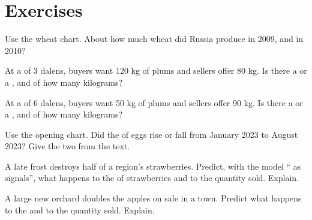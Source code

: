 \section{Exercises}

\begin{exercise}[$\star$]\label{exo:g7:markets-and-prices:1}
Use the wheat chart. About how much wheat did Russia produce in 2009, and in 2010?
\end{exercise}

\begin{exercise}[$\star$]\label{exo:g7:markets-and-prices:2}
At a  of 3 dalens, buyers want 120 kg of plums and sellers offer 80 kg. Is there a
 or a , and of how many kilograms?
\end{exercise}

\begin{exercise}[$\star$]\label{exo:g7:markets-and-prices:3}
At a  of 6 dalens, buyers want 50 kg of plums and sellers offer 90 kg. Is there a
 or a , and of how many kilograms?
\end{exercise}

\begin{exercise}[$\star$]\label{exo:g7:markets-and-prices:4}
Use the opening chart. Did the  of eggs rise or fall from January 2023 to August 2023?
Give the two  from the text.
\end{exercise}

\begin{exercise}[$\star\star$]\label{exo:g7:markets-and-prices:5}
A late frost destroys half of a region's strawberries. Predict, with the model `` as
signals'', what happens to the  of strawberries and to the quantity sold. Explain.
\end{exercise}

\begin{exercise}[$\star\star$]\label{exo:g7:markets-and-prices:6}
A large new orchard doubles the apples on sale in a town. Predict what happens to the 
and to the quantity sold. Explain.
\end{exercise}

